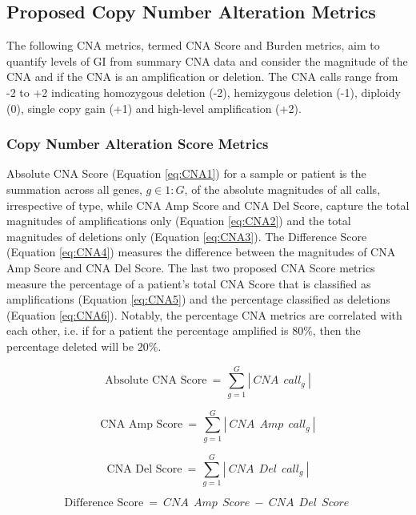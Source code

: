 \subsection{Proposed Copy Number Alteration Metrics}
\label{PCNA} 
The following CNA metrics, termed CNA Score and Burden metrics, aim to quantify levels of GI from summary CNA data and consider the magnitude of the CNA and if the CNA is an amplification or deletion. The CNA calls range from -2 to +2 indicating homozygous deletion (-2), hemizygous deletion (-1), diploidy (0), single copy gain (+1) and high-level amplification (+2).

\subsubsection{Copy Number Alteration Score Metrics}
Absolute CNA Score (Equation \ref{eq:CNA1}) for a sample or patient is the summation across all genes, $g \in 1:G$, of the absolute magnitudes of all calls, irrespective of type, while CNA Amp Score and CNA Del Score, capture the total magnitudes of amplifications only (Equation \ref{eq:CNA2}) and the total magnitudes of deletions only (Equation \ref{eq:CNA3}). The Difference Score (Equation \ref{eq:CNA4}) measures the difference between the magnitudes of CNA Amp Score and CNA Del Score. The last two proposed CNA Score metrics measure the percentage of a patient's total CNA Score that is classified as amplifications (Equation \ref{eq:CNA5}) and the percentage classified as deletions (Equation \ref{eq:CNA6}). Notably, the percentage CNA metrics are correlated with each other, i.e. if for a patient the percentage amplified is $80\%$, then the percentage deleted will be $20\%$.

\begin{equation}
\text{Absolute CNA Score}\: = \frac{}{}\sum_{g = 1}^{G}\left | \:CNA\:\:call_g\: \right |
\label{eq:CNA1}
\end{equation}

\begin{equation}
\text{CNA Amp Score}\: = \frac{}{}\sum_{g = 1}^{G}\left | \:CNA\:\:Amp\:\:call_g\: \right |
\label{eq:CNA2}
\end{equation}

\begin{equation}
\text{CNA Del Score}\: = \frac{}{}\sum_{g = 1}^{G}\left | \:CNA\:\:Del\:\:call_g\: \right |
\label{eq:CNA3}
\end{equation}

\begin{equation}
\text{Difference Score}\: =  \:CNA\:\:Amp\:\:Score\: - \:CNA\:\:Del\:\:Score\:
\label{eq:CNA4}
\end{equation}

